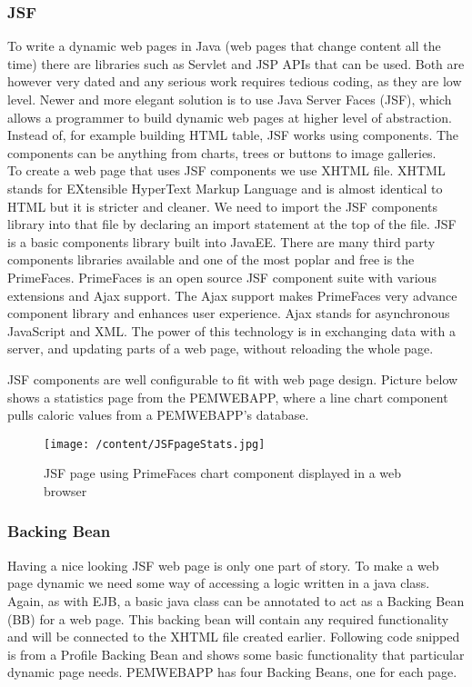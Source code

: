 \documentclass[12pt, a4paper]{report}   %
\begin{document}
\begin{enumerate}
\subsubsection{JSF}
To write a dynamic web pages in Java (web pages that change content all the time) there are libraries such as Servlet and JSP APIs that can be used. Both are however very dated and any serious work requires tedious coding, as they are low level. Newer and more elegant solution is to use Java Server Faces (JSF), which allows a programmer to build dynamic web pages at higher level of abstraction. Instead of, for example building HTML table, JSF works using components. The components can be anything from charts, trees or buttons to image galleries.\\
To create a web page that uses JSF components we use XHTML file. XHTML stands for EXtensible HyperText Markup Language and is almost identical to HTML but it is stricter and cleaner. We need to import the JSF components library into that file by declaring an import statement at the top of the file. 
JSF is a basic components library built into JavaEE. There are many third party components libraries available and one of the most poplar and free is the PrimeFaces. PrimeFaces is an open source JSF component suite with various extensions and Ajax support. The Ajax support makes PrimeFaces very advance component library and enhances user experience. Ajax stands for asynchronous JavaScript and XML. The power of this technology is in exchanging data with a server, and updating parts of a web page, without reloading the whole page.


JSF components are well configurable to fit with web page design. Picture below shows a statistics page from the PEMWEBAPP, where a line chart component pulls caloric values from a PEMWEBAPP's database.


\begin{figure}[H]
  \centering
	\texttt{[image: /content/JSFpageStats.jpg]}
	  \caption{JSF page using PrimeFaces chart component displayed in a web browser}
\end{figure}


\subsubsection{Backing Bean}
Having a nice looking JSF web page is only one part of story. To make a web page dynamic we need some way of accessing a logic written in a java class. Again, as with EJB, a basic java class can be annotated to act as a Backing Bean (BB) for a web page. This backing bean will contain any required functionality and will be connected to the XHTML file created earlier. Following code snipped is from a Profile Backing Bean and shows some basic functionality that particular dynamic page needs. PEMWEBAPP has four Backing Beans, one for each page.



\end{enumerate}
\end{document}
